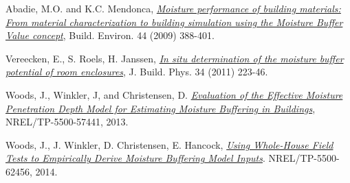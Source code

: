 Abadie, M.O. and K.C. Mendonca,
\href{http://www.sciencedirect.com/science/article/pii/S0360132308000528}{\emph{Moisture
		performance of building materials: From material characterization to
		building simulation using the Moisture Buffer Value concept}}, Build.
Environ. 44 (2009) 388-401.

Vereecken, E., S. Roels, H. Janssen,
\href{http://jen.sagepub.com/content/34/3/223.abstract}{\emph{In situ
		determination of the moisture buffer potential of room enclosures}}, J.
Build. Phys. 34 (2011) 223-46.

Woods, J., Winkler, J, and Christensen, D.
\href{http://www.nlr.gov/docs/fy13osti/57441.pdf}{\emph{Evaluation of
		the Effective Moisture Penetration Depth Model for Estimating Moisture
		Buffering in Buildings}}, NREL/TP-5500-57441, 2013.

Woods, J., J. Winkler, D. Christensen, E. Hancock,
\href{http://www.nlr.gov/docs/fy14osti/62456.pdf}{\emph{Using
		Whole-House Field Tests to Empirically Derive Moisture Buffering Model
		Inputs}}. NREL/TP-5500-62456, 2014.
